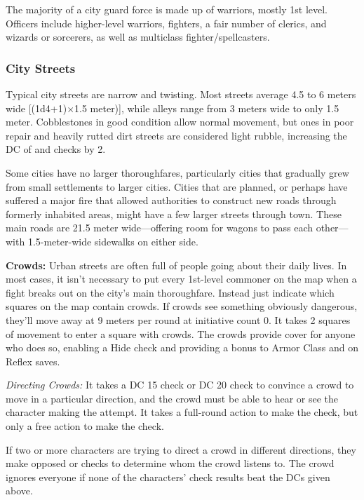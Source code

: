 The majority of a city guard force is made up of warriors, mostly 1st level. Officers include higher-level warriors, fighters, a fair number of clerics, and wizards or sorcerers, as well as multiclass fighter/spellcasters.

\subsubsection{City Streets}
Typical city streets are narrow and twisting. Most streets average 4.5 to 6 meters wide [(1d4+1)$\times$1.5 meter)], while alleys range from 3 meters wide to only 1.5 meter. Cobblestones in good condition allow normal movement, but ones in poor repair and heavily rutted dirt streets are considered light rubble, increasing the DC of  and  checks by 2.

Some cities have no larger thoroughfares, particularly cities that gradually grew from small settlements to larger cities. Cities that are planned, or perhaps have suffered a major fire that allowed authorities to construct new roads through formerly inhabited areas, might have a few larger streets through town. These main roads are 21.5 meter wide---offering room for wagons to pass each other---with 1.5-meter-wide sidewalks on either side.

\textbf{Crowds:} Urban streets are often full of people going about their daily lives. In most cases, it isn't necessary to put every 1st-level commoner on the map when a fight breaks out on the city's main thoroughfare. Instead just indicate which squares on the map contain crowds. If crowds see something obviously dangerous, they'll move away at 9 meters per round at initiative count 0. It takes 2 squares of movement to enter a square with crowds. The crowds provide cover for anyone who does so, enabling a Hide check and providing a bonus to Armor Class and on Reflex saves.

\textit{Directing Crowds:} It takes a DC 15  check or DC 20  check to convince a crowd to move in a particular direction, and the crowd must be able to hear or see the character making the attempt. It takes a full-round action to make the  check, but only a free action to make the  check.

If two or more characters are trying to direct a crowd in different directions, they make opposed  or  checks to determine whom the crowd listens to. The crowd ignores everyone if none of the characters' check results beat the DCs given above.

